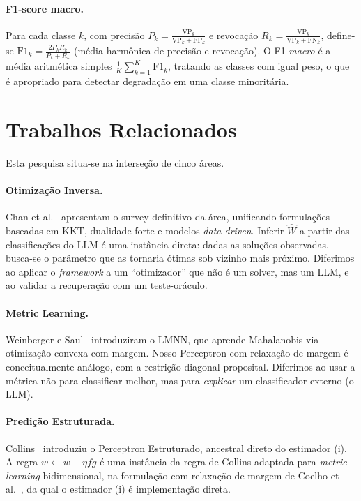 \documentclass[12pt,a4paper]{article}
\newcommand{\West}{\ensuremath{\hat{W}}}   %
\begin{document}
\paragraph{F1-score macro.} Para cada classe $k$, com precisão
$P_k = \frac{\text{VP}_k}{\text{VP}_k + \text{FP}_k}$ e revocação
$R_k = \frac{\text{VP}_k}{\text{VP}_k + \text{FN}_k}$, define-se
$\text{F1}_k = \frac{2 P_k R_k}{P_k + R_k}$ (média harmônica de precisão e revocação). O
F1 \emph{macro} é a média aritmética simples $\frac{1}{K}\sum_{k=1}^K \text{F1}_k$, tratando
as classes com igual peso, o que é apropriado para detectar degradação em uma classe
minoritária.

\section{Trabalhos Relacionados}
\label{sec:relacionados}

Esta pesquisa situa-se na interseção de cinco áreas.

\paragraph{Otimização Inversa.}
Chan et al.~\cite{chanInverseOptimization2025} apresentam o survey definitivo da área,
unificando formulações baseadas em KKT, dualidade forte e modelos \emph{data-driven}. Inferir
\West{} a partir das classificações do LLM é uma instância direta: dadas as soluções
observadas, busca-se o parâmetro que as tornaria ótimas sob vizinho mais próximo. Diferimos
ao aplicar o \emph{framework} a um ``otimizador'' que não é um solver, mas um LLM, e ao
validar a recuperação com um teste-oráculo.

\paragraph{Metric Learning.}
Weinberger e Saul~\cite{weinbergerDistanceMetric2009} introduziram o LMNN, que aprende
Mahalanobis via otimização convexa com margem. Nosso Perceptron com relaxação de margem é
conceitualmente análogo, com a restrição diagonal proposital. Diferimos ao usar a métrica
não para classificar melhor, mas para \emph{explicar} um classificador externo (o LLM).

\paragraph{Predição Estruturada.}
Collins~\cite{collinsDiscriminativeTraining2002} introduziu o Perceptron Estruturado,
ancestral direto do estimador (i). A regra $w \leftarrow w - \eta f g$ é uma instância da
regra de Collins adaptada para \emph{metric learning} bidimensional, na formulação com
relaxação de margem de Coelho et al.~\cite{coelhoPredicaoEstruturada2017}, da qual o
estimador (i) é implementação direta.
\end{document}

